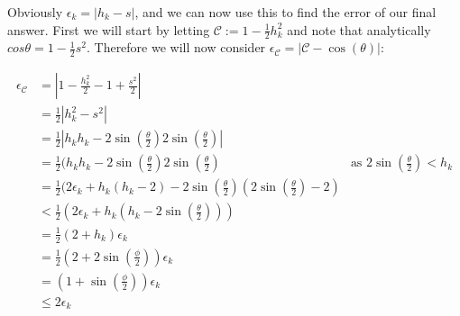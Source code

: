 Obviously \(\epsilon_k = |h_k - s|\), and we can now use this to find the error of our final answer. First we will start by letting \(\mathcal{C} := 1-\tfrac{1}{2}h_k^2\) and note that analytically \(cos\theta = 1 - \tfrac{1}{2}s^2\). Therefore we will now consider \(\epsilon_{\mathcal{C}} = |\mathcal{C} - \cos(\theta)|\):

\begin{displaymath}
\begin{align*}
	\epsilon_{\mathcal{C}} &= | 1 - \frac{h_k^2}{2} - 1 + \frac{s^2}{2}|\\
		&=\frac{1}{2}|h_k^2 - s^2|\\
		&=\frac{1}{2}|h_kh_k 
			- 2\sin(\frac{\theta}{2})2\sin(\frac{\theta}{2})|\\
		&=\frac{1}{2}(h_kh_k 
			- 2\sin(\frac{\theta}{2})2\sin(\frac{\theta}{2})
			&\textrm{as \(2\sin(\frac{\theta}{2}) < h_k\)}\\
		&=\frac{1}{2}(2\epsilon_k + h_k(h_k-2) - 2\sin(\frac{\theta}{2})
			(2\sin(\frac{\theta}{2}) - 2)\\
		&<\frac{1}{2}(2\epsilon_k + h_k(h_k - 2\sin(\frac{\theta}{2})))\\
			&=\frac{1}{2}(2+h_k)\epsilon_k\\
		&=\frac{1}{2}(2 + 2\sin(\frac{\phi}{2}))\epsilon_k\\
		&=(1 + \sin(\frac{\phi}{2}))\epsilon_k\\
		&\le2\epsilon_k
\end{align*}
\end{displaymath}

